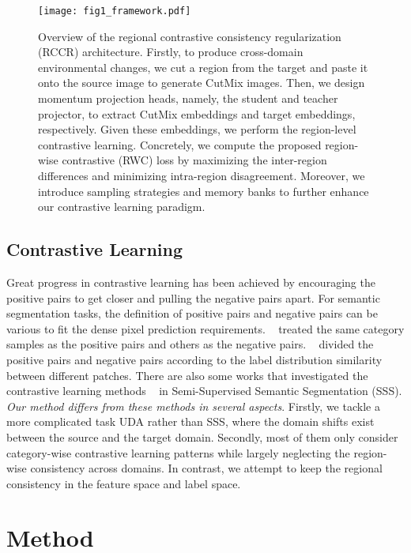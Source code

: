 \documentclass{article}
\begin{document}
\begin{figure*}[t]
\centering
\texttt{[image: fig1\_framework.pdf]}
\caption{Overview of the regional contrastive consistency regularization (RCCR) architecture. Firstly, to produce cross-domain environmental changes, we cut a region from the target and paste it onto the source image to generate CutMix images.
Then, we design momentum projection heads, namely, the student and teacher projector, to extract CutMix embeddings and target embeddings, respectively. Given these embeddings, we perform the region-level contrastive learning. Concretely, we compute the proposed region-wise contrastive (RWC) loss  by maximizing  the  inter-region  differences  and  minimizing intra-region disagreement. Moreover, we introduce sampling strategies and memory banks to further enhance our contrastive learning paradigm.
}
\label{fig1}
\end{figure*}

\subsection{Contrastive Learning}

Great progress in contrastive learning has been achieved  by encouraging the positive pairs to get closer and pulling the negative pairs apart. For semantic segmentation tasks,  the definition of positive pairs and negative pairs can be various to fit the dense pixel prediction requirements. ~\cite{wang2021exploring} treated the same category samples as the positive pairs and others as the negative pairs. ~\cite{liu2021domain} divided the positive pairs and negative pairs according to the label distribution similarity between different patches. There are also some works that investigated the contrastive learning methods ~\cite{lai2021semi} in Semi-Supervised Semantic Segmentation (SSS). \textit{Our method differs from these methods in several aspects}. Firstly, we tackle a more complicated task UDA rather than SSS, where the domain shifts exist between the source and the target domain. Secondly, most of them only consider category-wise contrastive learning patterns while largely neglecting the region-wise consistency across domains. In contrast, we attempt to keep the regional consistency in the feature space and label space.

\section{Method}
\end{document}
